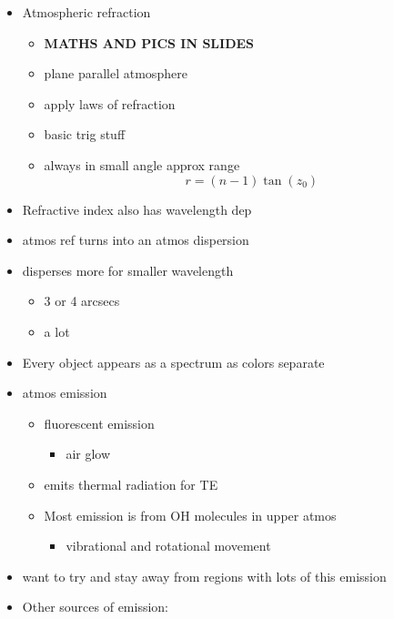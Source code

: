 \documentclass[a4paper,11pt,normalem]{article}
\begin{document}
\begin{itemize}
    \item Atmospheric refraction
        \begin{itemize}
            \item \textbf{MATHS AND PICS IN SLIDES}
            \item plane parallel atmosphere
            \item apply laws of refraction
            \item basic trig stuff
            \item always in small angle approx range
                \begin{equation*}
                    r = (n - 1)\tan{(z_0)}
                \end{equation*}
        \end{itemize}
    \item Refractive index also has wavelength dep
    \item atmos ref turns into an atmos dispersion
    \item disperses more for smaller wavelength
        \begin{itemize}
            \item 3 or 4 arcsecs
            \item a lot
        \end{itemize}
    \item Every object appears as a spectrum as colors separate
    \item atmos emission
        \begin{itemize}
            \item fluorescent emission
                \begin{itemize}
                    \item air glow
                \end{itemize}
            \item emits thermal radiation for TE
            \item Most emission is from OH molecules in upper atmos
                \begin{itemize}
                    \item vibrational and rotational movement
                \end{itemize}
        \end{itemize}
    \item want to try and stay away from regions with lots of this emission
    \item Other sources of emission:

\end{itemize}
\end{document}
